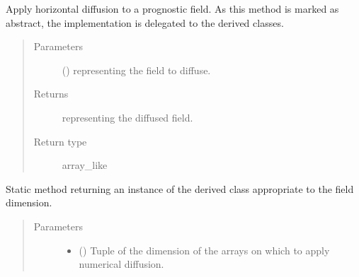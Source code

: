 \documentclass[letterpaper,10pt,english]{sphinxmanual}
\begin{document}
\begin{fulllineitems}
\begin{fulllineitems}
\begin{quote}
\begin{description}
\begin{itemize}
\end{itemize}

\end{description}\end{quote}

\end{fulllineitems}


\begin{fulllineitems}
\label{\detokenize{api:dycore.diffusion.Diffusion.apply}}
Apply horizontal diffusion to a prognostic field.
As this method is marked as abstract, the implementation is delegated to the derived classes.
\begin{quote}\begin{description}
\item[{Parameters}] \leavevmode
{} () \textendash{}  representing the field to diffuse.

\item[{Returns}] \leavevmode
{} representing the diffused field.

\item[{Return type}] \leavevmode
array\_like

\end{description}\end{quote}

\end{fulllineitems}


\begin{fulllineitems}
\label{\detokenize{api:dycore.diffusion.Diffusion.factory}}
Static method returning an instance of the derived class appropriate to the field dimension.
\begin{quote}\begin{description}
\item[{Parameters}] \leavevmode\begin{itemize}
\item {} 
 () \textendash{} Tuple of the dimension of the arrays on which to apply numerical diffusion.


\end{itemize}
\end{description}
\end{quote}
\end{fulllineitems}
\end{fulllineitems}
\end{document}

